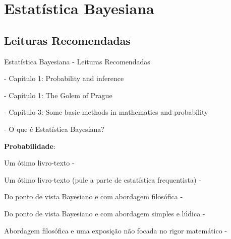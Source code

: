 \section{Estatística Bayesiana}

\subsection{Leituras Recomendadas}
\begin{frame}{Estatística Bayesiana - Leituras Recomendadas}
    \begin{vfilleditems}
        \item \textcite{gelman2013bayesian} - Capítulo 1: Probability and inference
        \item \textcite{mcelreath2020statistical} - Capítulo 1: The Golem of Prague
        \item \textcite{gelman2020regression} - Capítulo 3: Some basic methods in mathematics and probability
        \item \textcite{storopoli2021estatisticabayesianaR} - O que é Estatística Bayesiana?
        \item \textbf{Probabilidade}:
        \begin{vfilleditems}
            \item Um ótimo livro-texto - \textcite{bertsekasIntroductionProbability2nd2008}
            \item Um ótimo livro-texto (pule a parte de estatística frequentista) - \textcite{dekkingModernIntroductionProbability2010}
            \item Do ponto de vista Bayesiano e com abordagem filosófica - \textcite{jaynesProbabilityTheoryLogic2003}
            \item Do ponto de vista Bayesiano e com abordagem simples e lúdica - \textcite{kurtBayesianStatisticsFun2019}
            \item Abordagem filosófica e uma exposição não focada no rigor matemático - \textcite{diaconisTenGreatIdeas2019}
        \end{vfilleditems}
    \end{vfilleditems}
\end{frame}

